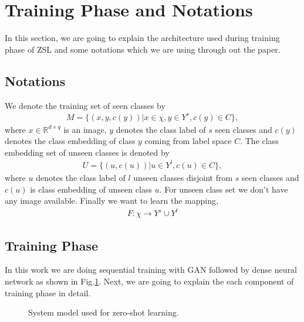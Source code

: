 \documentclass[11pt, conference, english]{IEEEtran}
\theoremstyle{plain}
\theoremstyle{definition}
\theoremstyle{remark}
\newcommand{\eq}[1]{\begin{align*}#1\end{align*}}
\begin{document}
	\section{Training Phase and Notations}
	In this section, we are going to explain the architecture used during training phase of ZSL and some notations which we are using through out the paper. 
	\subsection{Notations}
	We denote the training set of seen classes by\eq{M=\{(x,y,c(y))|x\in \chi, y \in Y^{s}, c(y) \in C \},}
	where $x\in \mathbb{R}^{d\times q}$ is an image, $y$ denotes the class label of $s$ seen classes and $c(y)$ denotes the class embedding of class $y$ coming from label space $C$. The class embedding set of unseen classes is denoted by \eq{U=\{(u,c(u))|u \in Y^l,c(u)\in C\},} where $u$ denotes the class label of $l$ unseen classes disjoint from $s$ seen classes and $c(u)$ is class embedding of unseen class $u$. For unseen class set we don't have any image available. Finally we want to learn the mapping,
	\eq{F:\chi \rightarrow Y^s \cup Y^l}
	 
	
	\subsection{Training Phase}
	In this work we are doing sequential training with GAN followed by dense neural network as shown in Fig.\ref{Fig:SystemModel}. Next, we are going to explain the each component of training phase in detail.
		\begin{figure}[h!]
			\centering
			\caption{System model used for zero-shot learning.}
			\label{Fig:SystemModel}
		\end{figure}
\end{document}
